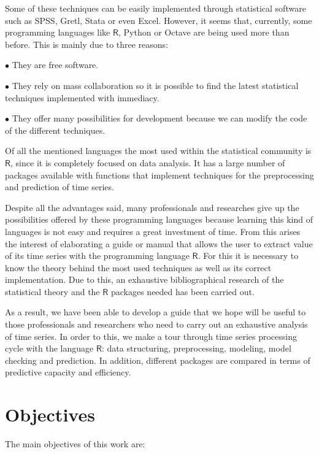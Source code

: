 \documentclass[12pt,a4paper,oneside]{article}
\begin{document}
Some of these techniques can be easily implemented through statistical software such as SPSS, Gretl, Stata or even Excel. However, it seems that, currently, some programming languages like $\textsf{R}$, Python or Octave are being used more than before. This is mainly due to three reasons:

\begin{itemize*}
  \item[$\bullet$]They are free software.
  \item[$\bullet$]They rely on mass collaboration so it is possible to find the latest statistical techniques implemented with immediacy.
  \item[$\bullet$]They offer many possibilities for development because we can modify the code of the different techniques.
\end{itemize*}

Of all the mentioned languages the most used within the statistical community is $\textsf{R}$, since it is completely focused on data analysis. It has a large number of packages available with functions that implement techniques for the preprocessing and prediction of time series.

Despite all the advantages said, many professionals and researches give up the possibilities offered by these programming languages because learning this kind of languages is not easy and requires a great investment of time. From this arises the interest of elaborating a guide or manual that allows the user to extract value of its time series with the programming language $\textsf{R}$. For this it is necessary to know the theory behind the most used techniques as well as its correct implementation. Due to this, an exhaustive bibliographical research of the statistical theory and the $\textsf{R}$ packages needed has been carried out.

As a result, we have been able to develop a guide that we hope will be useful to those professionals and researchers who need to carry out an exhaustive analysis of time series. In order to this, we make a tour through time series processing cycle with the language $\textsf{R}$: data structuring, preprocessing, modeling, model checking and prediction. In addition, different packages are compared in terms of predictive capacity and efficiency.

\section*{Objectives}
The main objectives of this work are:
\end{document}
